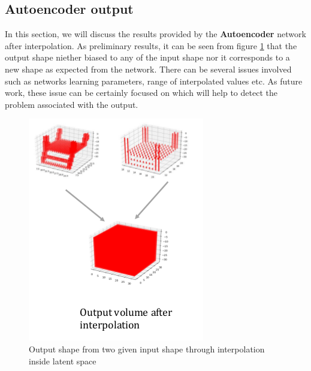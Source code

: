 \documentclass[11pt]{article}       %
\begin{document}
\subsection{Autoencoder output } \label{output}
In this section, we will discuss the results provided by the \textbf{Autoencoder} network after interpolation. As preliminary results, it can be seen from figure \ref{autooutput} that the output shape niether biased to any of the input shape nor it corresponds to a new shape as expected from the network. There can be several issues involved such as networks learning parameters, range of interpolated values etc. As future work, these issue can be certainly focused on which will help to detect the problem associated with the output.
\begin{figure}[h]
\begin{center}
\includegraphics[scale=0.7]{1.png} 
\caption{Output shape from two given input shape through interpolation inside latent space}\label{autooutput}
\end{center}
\end{figure}

\end{document}
